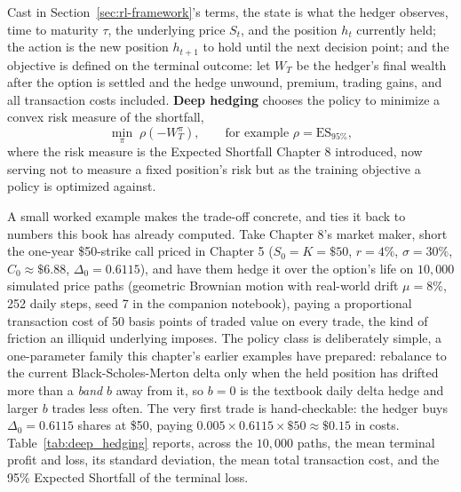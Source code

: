 \documentclass[../ai_in_finance]{subfiles}
\begin{document}
Cast in Section~\ref{sec:rl-framework}'s terms, the state is what the hedger observes, time to maturity $\tau$, the underlying price $S_t$, and the position $h_t$ currently held; the action is the new position $h_{t+1}$ to hold until the next decision point; and the objective is defined on the terminal outcome: let $W_T$ be the hedger's final wealth after the option is settled and the hedge unwound, premium, trading gains, and all transaction costs included. \textbf{Deep hedging} chooses the policy to minimize a convex risk measure of the shortfall,
\begin{equation*}
\min_{\pi}\; \rho\!\left(-W_T^{\pi}\right), \qquad \text{for example } \rho = \mathrm{ES}_{95\%},
\end{equation*}
where the risk measure is the Expected Shortfall Chapter 8 introduced, now serving not to measure a fixed position's risk but as the training objective a policy is optimized against.

A small worked example makes the trade-off concrete, and ties it back to numbers this book has already computed. Take Chapter 8's market maker, short the one-year \$50-strike call priced in Chapter 5 ($S_0=K=\$50$, $r=4\%$, $\sigma=30\%$, $C_0\approx\$6.88$, $\Delta_0=0.6115$), and have them hedge it over the option's life on $10{,}000$ simulated price paths (geometric Brownian motion with real-world drift $\mu=8\%$, 252 daily steps, seed 7 in the companion notebook), paying a proportional transaction cost of 50 basis points of traded value on every trade, the kind of friction an illiquid underlying imposes. The policy class is deliberately simple, a one-parameter family this chapter's earlier examples have prepared: rebalance to the current Black-Scholes-Merton delta only when the held position has drifted more than a \emph{band} $b$ away from it, so $b=0$ is the textbook daily delta hedge and larger $b$ trades less often. The very first trade is hand-checkable: the hedger buys $\Delta_0=0.6115$ shares at \$50, paying $0.005 \times 0.6115 \times \$50 \approx \$0.15$ in costs. Table~\ref{tab:deep_hedging} reports, across the $10{,}000$ paths, the mean terminal profit and loss, its standard deviation, the mean total transaction cost, and the 95\% Expected Shortfall of the terminal loss.
\end{document}
